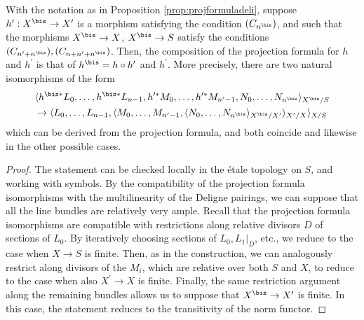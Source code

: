 \begin{corollary} \label{cor:compprojformula}
With the notation as in Proposition \ref{prop:projformuladeli}, suppose $h^{\prime}: X^{\bis} \to X^{\prime}$ is a morphism satisfying the condition $(C_{n^{\bis}})$, and such that the morphisms $X^{\bis} \to X$, $X^{\bis} \to S$ satisfy the conditions $(C_{n^{\prime} + n^{\bis}}), (C_{n+n^{\prime} + n^{\bis}})$. Then, the composition of the projection formula for $h$ and $h^{\prime}$ is that of $ h^{\bis}=h\circ h^{\prime}$ and $h^{\prime}$. More precisely, there are two natural isomorphisms of the form
\begin{multline*}
\langle h^{\bis \ast } L_0, \ldots, h^{\bis \ast}L_{n-1}, h^{\prime\ast} M_0, \ldots, h^{\prime\ast} M_{n^{\prime}-1}, N_{0}, \ldots, N_{n^{\bis}} \rangle_{X^{\bis}/S}\\
\to
\langle L_{0},\ldots, L_{n-1}, \langle M_{0},\ldots, M_{n^{\prime}-1},\langle N_{0},\ldots,N_{n^{\bis}}\rangle_{X^{\bis}/X^{\prime}}\rangle_{X^{\prime}/X}\rangle_{X/S}
\end{multline*}
which can be derived from the projection formula, and both coincide and likewise in the other possible cases.
\end{corollary}
\begin{proof}
The statement can be checked locally in the étale topology on $S$, and working with symbols. By the compatibility of the projection formula isomorphisms with the multilinearity of the Deligne pairings, we can suppose that all the line bundles are relatively very ample. Recall that the projection formula isomorphisms are compatible with restrictions along relative divisors $D$ of sections of $L_0$. By iteratively choosing sections of $L_0, L_1|_D $, etc., we reduce to the case when $X \to S$ is finite. Then, as in the construction, we can analogously restrict along divisors of the $M_i$, which are relative over both $S$ and $X$, to reduce to the case when also $X^{\prime} \to X$ is finite. Finally, the same restriction argument along the remaining bundles allows us to suppose that $X^{\bis} \to X^{\prime}$ is finite. In this case, the statement reduces to the transitivity of the norm functor.
\end{proof}

